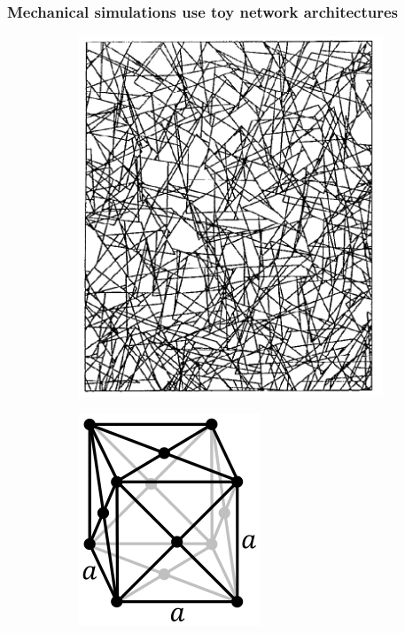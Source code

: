 \documentclass[9pt]{beamer}
\begin{document}
\begin{frame}
  \frametitle{Mechanical simulations use toy network architectures}
  \begin{figure}
    \begin{subfigure}[t]{0.33\textwidth}
      \centering
      \includegraphics[width=0.9\linewidth]{Figures/mikado_initial.png}
      \label{subfig:mikado}
    \end{subfigure}%
    \begin{subfigure}[t]{0.33\textwidth}
      \centering
      \includegraphics[width=0.9\linewidth]{Figures/fcc_lattice_wiki.png}

\end{subfigure}
\end{figure}
\end{frame}
\end{document}

